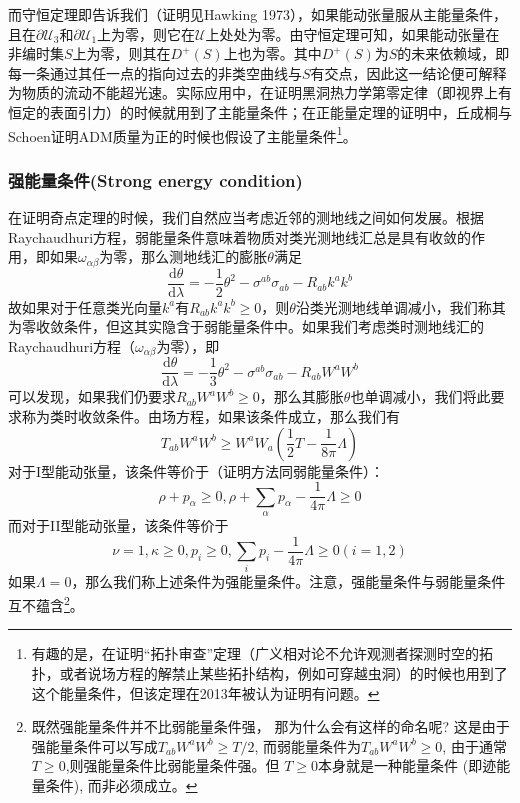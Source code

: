 \documentclass[hyperref, UTF8, a4paper]{ctexart}
\begin{document}
而守恒定理即告诉我们（证明见Hawking 1973），如果能动张量服从主能量条件，且在$\partial \mathscr{U}_{3}$和$\partial \mathscr{U}_{1}$上为零，则它在$\mathscr{U}$上处处为零。由守恒定理可知，如果能动张量在非编时集$S$上为零，则其在$D^{+}( S)$上也为零。其中$D^{+}( S)$为$S$的未来依赖域，即每一条通过其任一点的指向过去的非类空曲线与$S$有交点，因此这一结论便可解释为物质的流动不能超光速。实际应用中，在证明黑洞热力学第零定律（即视界上有恒定的表面引力）的时候就用到了主能量条件；在正能量定理的证明中，丘成桐与Schoen证明ADM质量为正的时候也假设了主能量条件\footnote{有趣的是，在证明“拓扑审查”定理（广义相对论不允许观测者探测时空的拓扑，或者说场方程的解禁止某些拓扑结构，例如可穿越虫洞）的时候也用到了这个能量条件，但该定理在2013年被认为证明有问题。}。
\subsubsection{强能量条件(Strong energy condition)}

在证明奇点定理的时候，我们自然应当考虑近邻的测地线之间如何发展。根据Raychaudhuri方程，弱能量条件意味着物质对类光测地线汇总是具有收敛的作用，即如果$\omega _{\alpha \beta }$为零，那么测地线汇的膨胀$\theta $满足
\begin{equation*}
	\frac{\mathrm{d} \theta }{\mathrm{d} \lambda } =-\frac{1}{2} \theta ^{2} -\sigma ^{ab} \sigma _{ab} -R_{ab} k^{a} k^{b}
\end{equation*}
故如果对于任意类光向量$k^{a}$有$R_{ab} k^{a} k^{b} \geq 0$，则$\theta $沿类光测地线单调减小，我们称其为零收敛条件，但这其实隐含于弱能量条件中。如果我们考虑类时测地线汇的Raychaudhuri方程（$\omega _{\alpha \beta }$为零），即
\begin{equation*}
	\frac{\mathrm{d} \theta }{\mathrm{d} \lambda } =-\frac{1}{3} \theta ^{2} -\sigma ^{ab} \sigma _{ab} -R_{ab} W^{a} W^{b}
\end{equation*}
可以发现，如果我们仍要求$R_{ab} W^{a} W^{b} \geq 0$，那么其膨胀$\theta $也单调减小，我们将此要求称为类时收敛条件。由场方程，如果该条件成立，那么我们有
\begin{equation*}
	T_{ab} W^{a} W^{b} \geq W^{a} W_{a}\left(\frac{1}{2} T-\frac{1}{8\pi } \Lambda \right)
\end{equation*}
对于I型能动张量，该条件等价于（证明方法同弱能量条件）：
\begin{equation*}
	\rho +p_{\alpha } \geq 0,\rho +\sum _{\alpha } p_{\alpha } -\frac{1}{4\pi } \Lambda \geq 0
\end{equation*}
而对于II型能动张量，该条件等价于
\begin{equation*}
	\nu =1,\kappa \geq 0,p_{i} \geq 0,\sum _{i} p_{i} -\frac{1}{4\pi } \Lambda \geq 0( i=1,2)
\end{equation*}
如果$\Lambda =0$，那么我们称上述条件为强能量条件。注意，强能量条件与弱能量条件互不蕴含\footnote{既然强能量条件并不比弱能量条件强， 那为什么会有这样的命名呢? 这是由于强能量条件可以写成$T_{ab} W^{a} W^{b} \geq T/2$, 而弱能量条件为$T_{ab} W^{a} W^{b} \geq 0$, 由于通常$T\geq 0$,则强能量条件比弱能量条件强。但 $T\geq 0$本身就是一种能量条件 (即迹能量条件), 而非必须成立。}。
\end{document}
